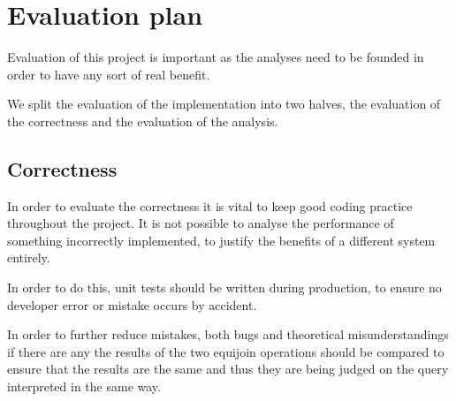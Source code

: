 \chapter{Evaluation plan} %
\begin{comment}
Project evaluation is very important, so it's important to think now about how you plan to measure success. For example, what functionality do you need to demonstrate?  What experiments to you need to undertake and what outcome(s) would constitute success?  What benchmarks should you use? How has your project extended the state of the art?  How do you measure qualitative aspects, such as ease of use?  These are the sort of questions that your project evaluation should address; this section should outline your plan.
\end{comment}
Evaluation of this project is important as the analyses need to be founded in order to have any sort of real benefit.

We split the evaluation of the implementation into two halves, the evaluation of the correctness and the evaluation of the analysis.

\section{Correctness}\label{sec:evaluationduringimplementation}
In order to evaluate the correctness it is vital to keep good coding practice throughout the project. It is not possible to analyse the performance of something incorrectly implemented, to justify the benefits of a different system entirely.

In order to do this, unit tests should be written during production, to ensure no developer error or mistake occurs by accident.

In order to further reduce mistakes, both bugs and theoretical misunderstandings if there are any the results of the two equijoin operations should be compared to ensure that the results are the same and thus they are being judged on the query interpreted in the same way.